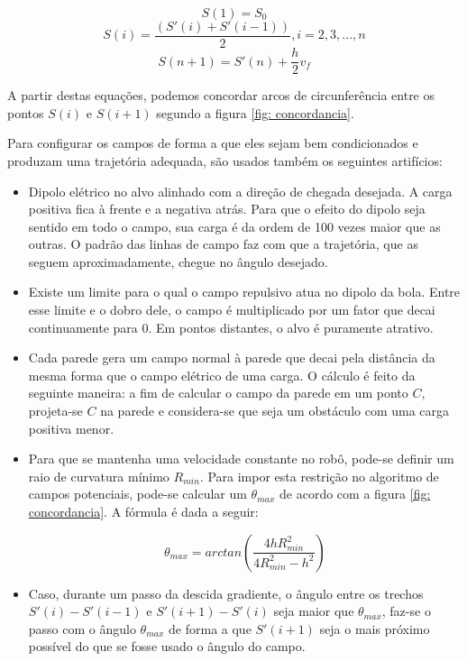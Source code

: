 \documentclass[a4paper,12pt]{article}
\begin{document}
\begin{equation}
	S(1) = S_{0}
\end{equation}
\begin{equation}
	S(i) = \frac{(S'(i)+S'(i-1))}{2}, i = 2,3,...,n
\end{equation}
\begin{equation}
	S(n+1) = S'(n) + \frac{h}{2} v_{f}
\end{equation}

A partir destas equações, podemos concordar arcos de circunferência entre os pontos $S(i)$ e $S(i+1)$ segundo a figura \ref{fig: concordancia}.

Para configurar os campos de forma a que eles sejam bem condicionados e produzam uma trajetória adequada, são usados também os seguintes artifícios:

\begin{itemize}
\item Dipolo elétrico no alvo alinhado com a direção de chegada desejada. A carga positiva fica à frente e a negativa atrás. Para que o efeito do dipolo seja sentido em todo o campo, sua carga é da ordem de 100 vezes maior que as outras. O padrão das linhas de campo faz com que a trajetória, que as seguem aproximadamente, chegue no ângulo desejado.
\item Existe um limite para o qual o campo repulsivo atua no dipolo da bola. Entre esse limite e o dobro dele, o campo é multiplicado por um fator que decai continuamente para 0. Em pontos distantes, o alvo é puramente atrativo.
\item Cada parede gera um campo normal à parede que decai pela distância da mesma forma que o campo elétrico de uma carga. O cálculo é feito da seguinte maneira: a fim de calcular o campo da parede em um ponto $C$, projeta-se $C$ na parede e considera-se que seja um obstáculo com uma carga positiva menor.
\item Para que se mantenha uma velocidade constante no robô, pode-se definir um raio de curvatura mínimo $R_{min}$. Para impor esta restrição no algoritmo de campos potenciais, pode-se calcular um $\theta_{max}$ de acordo com a figura \ref{fig: concordancia}. A fórmula é dada a seguir:

\begin{equation}
\theta_{max} = arctan(\frac{4hR_{min}^2}{4R_{min}^2 - h^2})
\end{equation}

\item Caso, durante um passo da descida gradiente, o ângulo entre os trechos $S'(i) - S'(i-1)$ e $S'(i+1) - S'(i)$ seja maior que $\theta_{max}$, faz-se o passo com o ângulo $\theta_{max}$ de forma a que $S'(i+1)$ seja o mais próximo possível do que se fosse usado o ângulo do campo.
\end{itemize}
\end{document}
